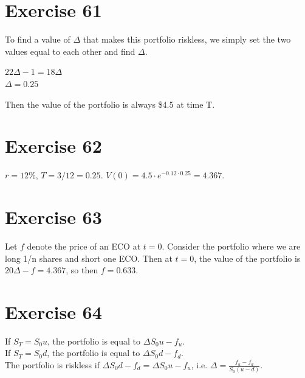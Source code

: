 \documentclass{article}
\begin{document}
\section*{Exercise 61}
To find a value of $\Delta$ that makes this portfolio riskless, we simply set the two values equal to each other and find $\Delta$.
\begin{center}
    $22\Delta - 1 = 18\Delta$ \\
    $\Delta = 0.25$
\end{center}
Then the value of the portfolio is always \$4.5 at time T.

\section*{Exercise 62}
$r = 12\%$, $T = 3/12 = 0.25$. $V(0) = 4.5 \cdot e^{-0.12 \cdot 0.25} = 4.367$.

\section*{Exercise 63}
Let $f$ denote the price of an ECO at $t=0$. Consider the portfolio where we are long 1/n shares and short one ECO.
Then at $t=0$, the value of the portfolio is $20\Delta - f = 4.367$, so then $f = 0.633$.

\section*{Exercise 64}
If $S_T = S_0u$, the portfolio is equal to $\Delta S_0u - f_u$. \\
If $S_T = S_0d$, the portfolio is equal to $\Delta S_0d - f_d$. \\
The portfolio is riskless if $\Delta S_0d - f_d = \Delta S_0u - f_u$, i.e. $\Delta = \frac{f_u - f_d}{S_0(u-d)}$.
\end{document}
